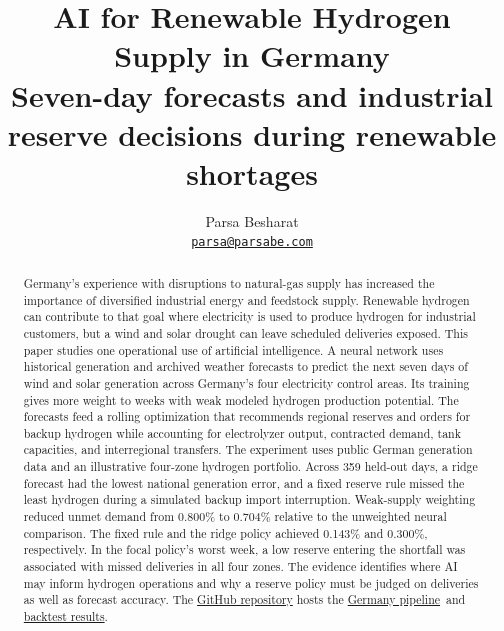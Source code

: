 \documentclass[10pt,a4paper,twocolumn]{article}
\title{\bfseries\color{Ink} AI for Renewable Hydrogen Supply in Germany\\[3pt]
  \large\normalfont Seven-day forecasts and industrial reserve decisions during renewable shortages}
\author{Parsa Besharat\\[-1pt]\normalsize\href{mailto:parsa@parsabe.com}{\texttt{parsa@parsabe.com}}}
\date{}
\newcommand{\GitHubURL}{https://github.com/parsabe/Beyond-Normal-Weather}
\newcommand{\studyrepo}{\href{\GitHubURL/tree/germany-ai-operations/germany}{Germany pipeline}}
\newcommand{\studydata}{\href{\GitHubURL/tree/germany-ai-operations/germany/report}{backtest results}}
\begin{document}
\maketitle

\begin{abstract}
Germany's experience with disruptions to natural-gas supply has increased the importance of diversified industrial energy and feedstock supply. Renewable hydrogen can contribute to that goal where electricity is used to produce hydrogen for industrial customers, but a wind and solar drought can leave scheduled deliveries exposed. This paper studies one operational use of artificial intelligence. A neural network uses historical generation and archived weather forecasts to predict the next seven days of wind and solar generation across Germany's four electricity control areas. Its training gives more weight to weeks with weak modeled hydrogen production potential. The forecasts feed a rolling optimization that recommends regional reserves and orders for backup hydrogen while accounting for electrolyzer output, contracted demand, tank capacities, and interregional transfers. The experiment uses public German generation data and an illustrative four-zone hydrogen portfolio. Across 359 held-out days, a ridge forecast had the lowest national generation error, and a fixed reserve rule missed the least hydrogen during a simulated backup import interruption. Weak-supply weighting reduced unmet demand from 0.800\% to 0.704\% relative to the unweighted neural comparison. The fixed rule and the ridge policy achieved 0.143\% and 0.300\%, respectively. In the focal policy's worst week, a low reserve entering the shortfall was associated with missed deliveries in all four zones. The evidence identifies where AI may inform hydrogen operations and why a reserve policy must be judged on deliveries as well as forecast accuracy. The \href{\GitHubURL}{GitHub repository} hosts the \studyrepo\ and \studydata.
\end{abstract}
\end{document}
